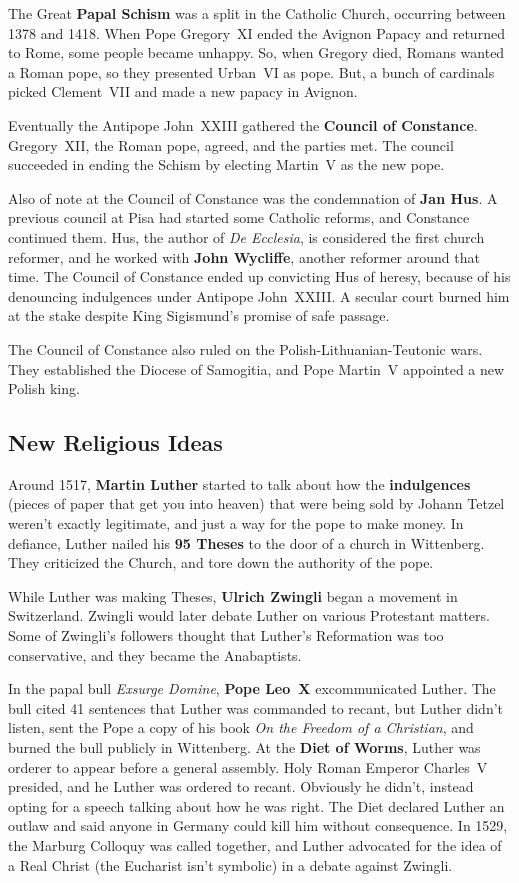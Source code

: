 The Great \textbf{Papal Schism} was a split in the Catholic Church, occurring between 1378 and 1418.
When Pope Gregory~XI ended the Avignon Papacy and returned to Rome, some people became unhappy.
So, when Gregory died, Romans wanted a Roman pope, so they presented Urban~VI as pope.
But, a bunch of cardinals picked Clement~VII and made a new papacy in Avignon.

Eventually the Antipope John~XXIII gathered the \textbf{Council of Constance}.
Gregory~XII, the Roman pope, agreed, and the parties met.
The council succeeded in ending the Schism by electing Martin~V as the new pope.

Also of note at the Council of Constance was the condemnation of \textbf{Jan Hus}.
A previous council at Pisa had started some Catholic reforms, and Constance continued them.
Hus, the author of \textit{De Ecclesia}, is considered the first church reformer,
and he worked with \textbf{John Wycliffe}, another reformer around that time.
The Council of Constance ended up convicting Hus of heresy,
because of his denouncing indulgences under Antipope John~XXIII\@.
A secular court burned him at the stake despite King Sigismund's promise of safe passage.

The Council of Constance also ruled on the Polish-Lithuanian-Teutonic wars.
They established the Diocese of Samogitia, and Pope Martin~V appointed a new Polish king.

\subsection*{New Religious Ideas}

Around 1517, \textbf{Martin Luther} started to talk about how the
\textbf{indulgences} (pieces of paper that get you into heaven)
that were being sold by Johann Tetzel weren't exactly legitimate, and just a way for the pope to make money.
In defiance, Luther nailed his \textbf{95 Theses} to the door of a church in Wittenberg.
They criticized the Church, and tore down the authority of the pope.

While Luther was making Theses, \textbf{Ulrich Zwingli} began a movement in Switzerland.
Zwingli would later debate Luther on various Protestant matters.
Some of Zwingli's followers thought that Luther's Reformation was too conservative, and they became the Anabaptists.

In the papal bull \textit{Exsurge Domine}, \textbf{Pope Leo~X} excommunicated Luther.
The bull cited 41 sentences that Luther was commanded to recant,
but Luther didn't listen, sent the Pope a copy of his book \textit{On the Freedom of a Christian},
and burned the bull publicly in Wittenberg.
At the \textbf{Diet of Worms}, Luther was orderer to appear before a general assembly.
Holy Roman Emperor Charles~V presided, and he Luther was ordered to recant.
Obviously he didn't, instead opting for a speech talking about how he was right.
The Diet declared Luther an outlaw and said anyone in Germany could kill him without consequence.
In 1529, the Marburg Colloquy was called together,
and Luther advocated for the idea of a Real Christ (the Eucharist isn't symbolic) in a debate against Zwingli.

